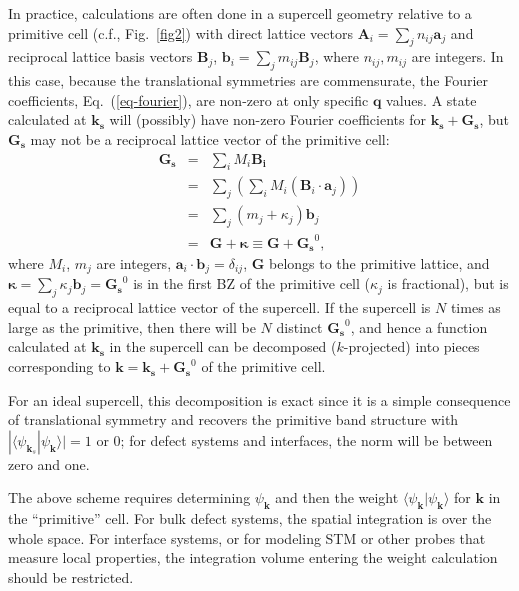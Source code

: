 \documentclass[aps,prb,showpacs,twocolumn,reprint,superscriptaddress]{revtex4-1}
\begin{document}
In practice, calculations are often done in a supercell geometry relative to a primitive cell (c.f.,
Fig.~\ref{fig2}) with
direct lattice vectors $\mathbf{A}_i = \sum_j n_{ij} \mathbf{a}_j$ and reciprocal lattice basis vectors
$\mathbf{B}_j$, $\mathbf{b}_i = \sum_j m_{ij} \mathbf{B}_j$, where
$n_{ij}, m_{ij}$ are integers. In this case, because the translational symmetries are commensurate, the
Fourier coefficients, Eq.~(\ref{eq-fourier}), are non-zero at only specific $\mathbf{q}$ values.
A state calculated at $\mathbf{k_s}$ will (possibly) have non-zero Fourier coefficients for $\mathbf{k_s}+\mathbf{G_s}$,
but $\mathbf{G_s}$ may not be a reciprocal lattice vector of the primitive cell:
\begin{eqnarray*}
  \mathbf{G_s} & = & \sum_i M_i \mathbf{B_i} \\
               & = & \sum_j \left( \sum_i M_i (\mathbf{B}_i\cdot\mathbf{a}_j)\right) \\
               & = & \sum_j (m_j + \kappa_j) \mathbf{b}_j \\
               & = & \mathbf{G} + \mathbf{\kappa}  \equiv \mathbf{G} + \mathbf{G_s}^0 ,
\end{eqnarray*}
where $M_i$, $m_j$ are integers, $\mathbf{a}_i\cdot\mathbf{b}_j=\delta_{ij}$, $\mathbf{G}$ belongs to the
primitive lattice, and
$\mathbf{\kappa} = \sum_j \kappa_j \mathbf{b}_j = \mathbf{G_s}^0$ is in the first BZ of the primitive cell
($\kappa_j$ is fractional), but is equal to a
reciprocal lattice vector of the supercell. If the supercell is $N$ times as
large as the primitive, then there will be $N$ distinct $\mathbf{G_s}^0$, and hence a function calculated at
$\mathbf{k_s}$ in the supercell can be decomposed ($k$-projected) into pieces corresponding to $\mathbf{k} =
\mathbf{k_s} + \mathbf{G_s}^0$ of the primitive cell.


For an ideal supercell, this decomposition is exact since it is a simple consequence
of translational symmetry and recovers the primitive band structure with
$|\langle\psi_{\mathbf{k}_s}|\psi_{\mathbf{k}}\rangle|=1$ or 0; 
for defect systems and interfaces, the norm will be between zero and one.  

The above scheme requires determining $\psi_\mathbf{k}$ and then the weight
$\langle\psi_\mathbf{k}|\psi_\mathbf{k}\rangle$ for $\mathbf{k}$ in the ``primitive'' cell. For bulk
defect systems, the spatial integration is over the whole space. For interface systems, or for modeling STM
or other probes that measure local properties, the integration volume entering the weight calculation should
be restricted.
\end{document}
